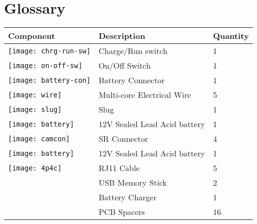 
\section{Glossary}
\label{sec:glossary}
\begin{longtable}{| l | l| l |}
\hline
\textbf{Component} & \textbf{Description} & \textbf{Quantity} \\ \hline
\texttt{[image: chrg-run-sw]}  & Charge/Run switch & 1 \\ \hline
\texttt{[image: on-off-sw]}  & On/Off Switch & 1 \\ \hline
\texttt{[image: battery-con]}  & Battery Connector & 1 \\ \hline
\texttt{[image: wire]}  & Multi-core Electrical Wire & 5 \\ \hline
\texttt{[image: slug]}  & Slug & 1 \\ \hline
\texttt{[image: battery]}  & 12V Sealed Lead Acid battery & 1 \\ \hline
\texttt{[image: camcon]}  & SR Connector & 4 \\ \hline
\texttt{[image: battery]}  & 12V Sealed Lead Acid battery & 1 \\ \hline
\texttt{[image: 4p4c]}  & RJ11 Cable & 5 \\ \hline
[photo]  & USB Memory Stick & 2 \\ \hline
[photo]  & Battery Charger & 1 \\ \hline
[photo]  & PCB Spacers & 16 \\ \hline
\end{longtable}
